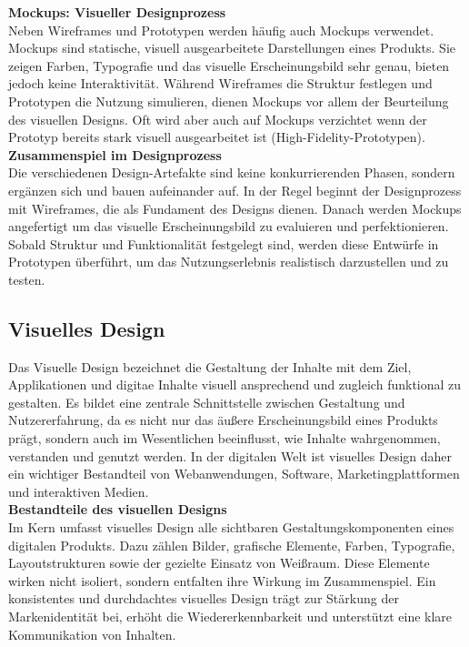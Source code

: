 \textbf{Mockups: Visueller Designprozess} \\
Neben Wireframes und Prototypen werden häufig auch Mockups verwendet. Mockups sind statische, visuell ausgearbeitete 
Darstellungen eines Produkts. Sie zeigen Farben, Typografie und das visuelle Erscheinungsbild sehr genau, bieten 
jedoch keine Interaktivität. Während Wireframes die Struktur festlegen und Prototypen die Nutzung simulieren, 
dienen Mockups vor allem der Beurteilung des visuellen Designs. Oft wird aber auch auf Mockups verzichtet wenn der Prototyp bereits stark visuell ausgearbeitet ist (High-Fidelity-Prototypen).\cite{popwebdesign_wire}\cite{justinmind_wireframe_prototyp_mockup}\cite{miro_wire}\cite{justinmindLowHigh_fidelity}\\

\textbf{Zusammenspiel im Designprozess} \\
Die verschiedenen Design-Artefakte sind keine konkurrierenden Phasen, sondern ergänzen sich und bauen aufeinander auf. In der Regel beginnt der
Designprozess mit Wireframes, die als Fundament des Designs dienen. Danach werden Mockups angefertigt um das visuelle Erscheinungsbild zu evaluieren und perfektionieren. Sobald Struktur und Funktionalität festgelegt sind, 
werden diese Entwürfe in Prototypen überführt, um das Nutzungserlebnis realistisch darzustellen und zu testen.\cite{popwebdesign_wire}\cite{justinmind_wireframe_prototyp_mockup}\cite{miro_wire}
\vspace{0.5em}

\subsection{Visuelles Design}

Das Visuelle Design bezeichnet die Gestaltung der Inhalte mit dem Ziel, Applikationen und digitae Inhalte
visuell ansprechend und zugleich funktional zu gestalten. Es bildet eine zentrale Schnittstelle zwischen
Gestaltung und Nutzererfahrung, da es nicht nur das äußere Erscheinungsbild eines Produkts prägt, sondern 
auch im Wesentlichen beeinflusst, wie Inhalte wahrgenommen, verstanden und genutzt werden. In der digitalen Welt 
ist visuelles Design daher ein wichtiger Bestandteil von Webanwendungen, Software, Marketingplattformen 
und interaktiven Medien.\cite{Toolmaster_Design}\cite{StudySmarter_Visual_Design}\\

\textbf{Bestandteile des visuellen Designs}\\
Im Kern umfasst visuelles Design alle sichtbaren Gestaltungskomponenten eines digitalen Produkts. Dazu 
zählen Bilder, grafische Elemente, Farben, Typografie, Layoutstrukturen sowie der gezielte Einsatz von 
Weißraum. Diese Elemente wirken nicht isoliert, sondern entfalten ihre Wirkung im Zusammenspiel. Ein
konsistentes und durchdachtes visuelles Design trägt zur Stärkung der Markenidentität bei, erhöht die 
Wiedererkennbarkeit und unterstützt eine klare Kommunikation von Inhalten.\cite{Toolmaster_Design}\cite{StudySmarter_Visual_Design}\\

